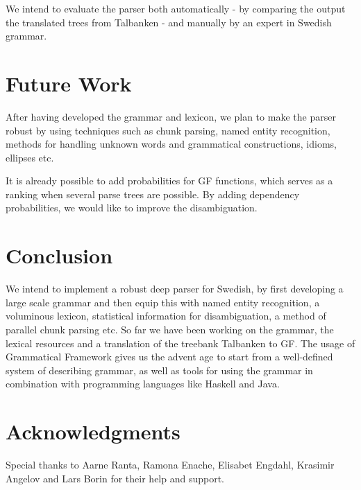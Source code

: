 \documentclass[submission]{eptcs} %
\begin{document}
We intend to evaluate the parser both automatically - by comparing the output
the translated trees from Talbanken - and manually by an expert in Swedish grammar.

\section{Future Work}

After having developed the grammar and lexicon, we plan to 
make the parser robust by using techniques such as chunk parsing, named
entity recognition, methods for handling unknown words and
grammatical constructions, idioms, ellipses etc. 

It is already possible to add probabilities for GF functions,
which serves as a ranking when several parse trees are possible.
By adding dependency probabilities, we would like to improve the
disambiguation.


\section{Conclusion}
We intend to implement a robust deep parser for Swedish, by first developing
a large scale grammar and then equip this with named entity recognition, a
voluminous lexicon, statistical information for disambiguation,
a method of parallel chunk parsing etc.
So far we have been working on the grammar, the lexical resources and
a translation of the treebank Talbanken to GF.
The usage of Grammatical Framework gives us the advent age to start from
a well-defined system of describing grammar, as well as tools for
using the grammar in combination with programming languages like Haskell
and Java. 


\section{Acknowledgments}
Special thanks to Aarne Ranta, Ramona Enache, Elisabet Engdahl, Krasimir
Angelov and Lars Borin for their help and support.



\nocite{*}


\end{document}
